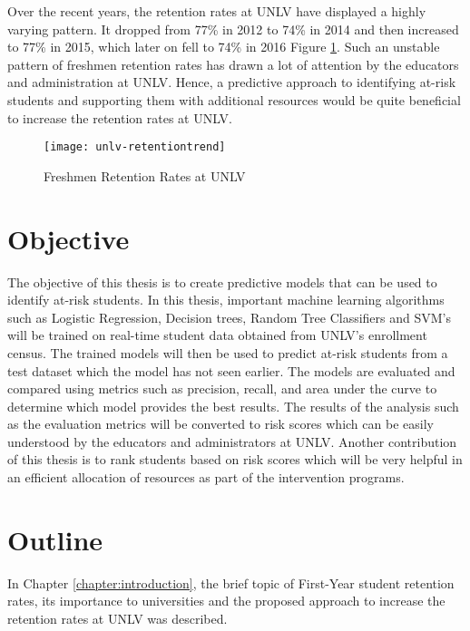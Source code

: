 \documentclass[11pt,openright]{report}
\begin{document}
Over the recent years, the retention rates at UNLV have displayed a highly varying pattern. It dropped from 77\% in 2012 to 74\% in 2014 and then increased to 77\% in 2015, which later on fell to 74\% in 2016 Figure \ref{fig:unlv_retention_trend}. Such an unstable pattern of freshmen retention rates has drawn a lot of attention by the educators and administration at UNLV. Hence, a predictive approach to identifying at-risk students and supporting them with additional resources would be quite beneficial to increase the retention rates at UNLV. 

\begin{figure}
	\centering
	\texttt{[image: unlv-retentiontrend]}
	\caption{Freshmen Retention Rates at UNLV}
	\label{fig:unlv_retention_trend}
\end{figure}

\section{Objective}\label{section:objective}
The objective of this thesis is to create predictive models that can be used to identify at-risk students. In this thesis, important machine learning algorithms such as Logistic Regression, Decision trees, Random Tree Classifiers and SVM's will be trained on real-time student data obtained from UNLV's enrollment census. The trained models will then be used to predict at-risk students from a test dataset which the model has not seen earlier. The models are evaluated and compared using metrics such as precision, recall, and area under the curve to determine which model provides the best results. The results of the analysis such as the evaluation metrics will be converted to risk scores which can be easily understood by the educators and administrators at UNLV. Another contribution of this thesis is to rank students based on risk scores which will be very helpful in an efficient allocation of resources as part of the intervention programs.

\section{Outline}\label{section:outline}

In Chapter \ref{chapter:introduction}, the brief topic of First-Year student retention rates, its importance to universities and the proposed approach to increase the retention rates at UNLV was described.\newline
\end{document}
